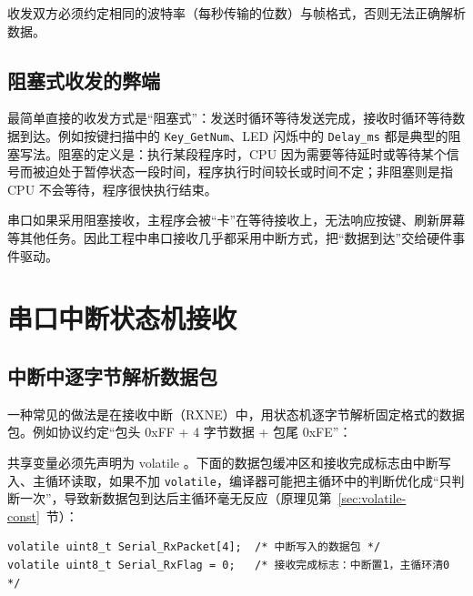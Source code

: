 收发双方必须约定相同的波特率（每秒传输的位数）与帧格式，否则无法正确解析数据。

\subsection{阻塞式收发的弊端}

最简单直接的收发方式是“阻塞式”：发送时循环等待发送完成，接收时循环等待数据到达。例如按键扫描中的 \texttt{Key\_GetNum}、LED 闪烁中的 \texttt{Delay\_ms} 都是典型的阻塞写法。阻塞的定义是：执行某段程序时，CPU 因为需要等待延时或等待某个信号而被迫处于暂停状态一段时间，程序执行时间较长或时间不定；非阻塞则是指 CPU 不会等待，程序很快执行结束。

串口如果采用阻塞接收，主程序会被“卡”在等待接收上，无法响应按键、刷新屏幕等其他任务。因此工程中串口接收几乎都采用中断方式，把“数据到达”交给硬件事件驱动。

\section{串口中断状态机接收}

\subsection{中断中逐字节解析数据包}

一种常见的做法是在接收中断（RXNE）中，用状态机逐字节解析固定格式的数据包。例如协议约定“包头 0xFF + 4 字节数据 + 包尾 0xFE”：

\begin{anybox}{共享变量必须先声明为 volatile}
。下面的数据包缓冲区和接收完成标志由中断写入、主循环读取，如果不加 \texttt{volatile}，编译器可能把主循环中的判断优化成“只判断一次”，导致新数据包到达后主循环毫无反应（原理见第~\ref{sec:volatile-const}~节）：
\end{anybox}

\begin{lstlisting}[style=c]
volatile uint8_t Serial_RxPacket[4];  /* 中断写入的数据包 */
volatile uint8_t Serial_RxFlag = 0;   /* 接收完成标志：中断置1，主循环清0 */
\end{lstlisting}

